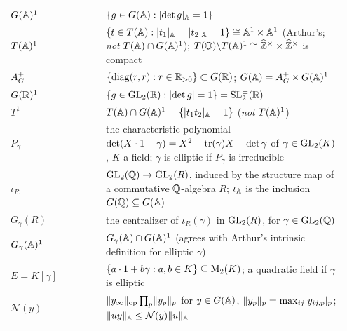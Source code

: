 \begin{longtable}{@{}p{0.27\linewidth}p{0.68\linewidth}@{}}
$G(\mathbb{A})^1$ & $\{g\in G(\mathbb{A}):\lvert\det g\rvert_{\mathbb{A}}=1\}$ \\
$T(\mathbb{A})^1$ & $\{t\in T(\mathbb{A}):\lvert t_1\rvert_{\mathbb{A}}=\lvert t_2\rvert_{\mathbb{A}}=1\}\cong\mathbb{A}^1\times\mathbb{A}^1$ (Arthur's; \emph{not} $T(\mathbb{A})\cap G(\mathbb{A})^1$);
  $T(\mathbb{Q})\backslash T(\mathbb{A})^1\cong\widehat{\mathbb{Z}}^\times\times\widehat{\mathbb{Z}}^\times$ is compact \\
$A_G^+$ & $\{\operatorname{diag}(r,r):r\in\mathbb{R}_{>0}\}\subset G(\mathbb{R})$; $G(\mathbb{A})=A_G^+\times G(\mathbb{A})^1$ \\
$G(\mathbb{R})^1$ & $\{g\in\mathrm{GL}_2(\mathbb{R}):\lvert\det g\rvert=1\}=\mathrm{SL}_2^\pm(\mathbb{R})$ \\
$T^1$ & $T(\mathbb{A})\cap G(\mathbb{A})^1=\{\lvert t_1t_2\rvert_{\mathbb{A}}=1\}$ (\emph{not} $T(\mathbb{A})^1$) \\
$P_\gamma$ & the characteristic polynomial $\det(X\cdot1-\gamma)=X^2-\operatorname{tr}(\gamma)X+\det\gamma$ of $\gamma\in\mathrm{GL}_2(K)$, $K$ a field; $\gamma$ is elliptic if $P_\gamma$ is irreducible \\
$\iota_R$ & $\mathrm{GL}_2(\mathbb{Q})\to\mathrm{GL}_2(R)$, induced by the structure map of a commutative $\mathbb{Q}$-algebra $R$; $\iota_{\mathbb{A}}$ is the inclusion $G(\mathbb{Q})\subseteq G(\mathbb{A})$ \\
$G_\gamma(R)$ & the centralizer of $\iota_R(\gamma)$ in $\mathrm{GL}_2(R)$, for $\gamma\in\mathrm{GL}_2(\mathbb{Q})$ \\
$G_\gamma(\mathbb{A})^1$ & $G_\gamma(\mathbb{A})\cap G(\mathbb{A})^1$ (agrees with Arthur's intrinsic definition for elliptic $\gamma$) \\
$E=K[\gamma]$ & $\{a\cdot1+b\gamma:a,b\in K\}\subseteq\mathrm{M}_2(K)$; a quadratic field if $\gamma$ is elliptic \\
$\mathcal N(y)$ & $\lVert y_\infty\rVert_{\mathrm{op}}\prod_p\lVert y_p\rVert_p$ for $y\in G(\mathbb{A})$, $\lVert y_p\rVert_p=\max_{ij}\lvert y_{ij,p}\rvert_p$; $\lVert uy\rVert_{\mathbb{A}}\le\mathcal N(y)\lVert u\rVert_{\mathbb{A}}$ \\
\bottomrule
\end{longtable}

